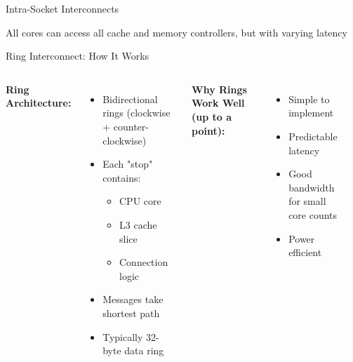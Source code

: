 \documentclass[aspectratio=169,12pt]{beamer}
\begin{document}
\begin{frame}{Intra-Socket Interconnects}
\begin{center}
\end{center}

All cores can access all cache and memory controllers, but with varying latency
\end{frame}

\begin{frame}{Ring Interconnect: How It Works}
\begin{columns}[T]
\textbf{Ring Architecture:}
\begin{itemize}
\item Bidirectional rings (clockwise + counter-clockwise)
\item Each "stop" contains:
  \begin{itemize}
  \item CPU core
  \item L3 cache slice
  \item Connection logic
  \end{itemize}
\item Messages take shortest path
\item Typically 32-byte data ring
\end{itemize}

\vspace{0.3cm}
\textbf{Why Rings Work Well (up to a point):}
\begin{itemize}
\item Simple to implement
\item Predictable latency
\item Good bandwidth for small core counts
\item Power efficient
\end{itemize}

\begin{center}
\end{center}
\end{columns}
\end{frame}
\end{document}
